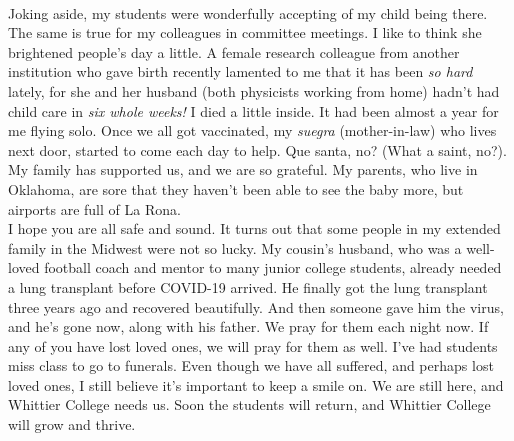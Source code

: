 \documentclass[../../main.tex]{subfiles}
\begin{document}
\\
\vspace{0.25cm}
Joking aside, my students were wonderfully accepting of my child being there.  The same is true for my colleagues in committee meetings.  I like to think she brightened people's day a little.  A female research colleague from another institution who gave birth recently lamented to me that it has been \textit{so hard} lately, for she and her husband (both physicists working from home) hadn't had child care in \textit{six whole weeks!}  I died a little inside.  It had been almost a year for me flying solo.  Once we all got vaccinated, my \textit{suegra} (mother-in-law) who lives next door, started to come each day to help.  Que santa, no? (What a saint, no?).  My family has supported us, and we are so grateful.  My parents, who live in Oklahoma, are sore that they haven't been able to see the baby more, but airports are full of La Rona.
\\
\vspace{0.25cm}
I hope you are all safe and sound.  It turns out that some people in my extended family in the Midwest were not so lucky.  My cousin's husband, who was a well-loved football coach and mentor to many junior college students, already needed a lung transplant before COVID-19 arrived.  He finally got the lung transplant three years ago and recovered beautifully.  And then someone gave him the virus, and he's gone now, along with his father.  We pray for them each night now.  If any of you have lost loved ones, we will pray for them as well.  I've had students miss class to go to funerals.  Even though we have all suffered, and perhaps lost loved ones, I still believe it's important to keep a smile on.  We are still here, and Whittier College needs us.  Soon the students will return, and Whittier College will grow and thrive.
\end{document}

